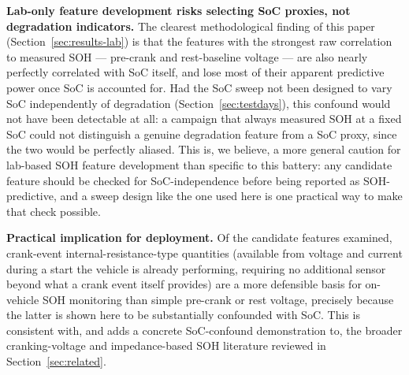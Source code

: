 \documentclass[conference]{IEEEtran}
\begin{document}
\textbf{Lab-only feature development risks selecting SoC proxies, not degradation indicators.} The clearest methodological finding of this paper (Section~\ref{sec:results-lab}) is that the features with the strongest raw correlation to measured SOH --- pre-crank and rest-baseline voltage --- are also nearly perfectly correlated with SoC itself, and lose most of their apparent predictive power once SoC is accounted for. Had the SoC sweep not been designed to vary SoC independently of degradation (Section~\ref{sec:testdays}), this confound would not have been detectable at all: a campaign that always measured SOH at a fixed SoC could not distinguish a genuine degradation feature from a SoC proxy, since the two would be perfectly aliased. This is, we believe, a more general caution for lab-based SOH feature development than specific to this battery: any candidate feature should be checked for SoC-independence before being reported as SOH-predictive, and a sweep design like the one used here is one practical way to make that check possible.

\textbf{Practical implication for deployment.} Of the candidate features examined, crank-event internal-resistance-type quantities (available from voltage and current during a start the vehicle is already performing, requiring no additional sensor beyond what a crank event itself provides) are a more defensible basis for on-vehicle SOH monitoring than simple pre-crank or rest voltage, precisely because the latter is shown here to be substantially confounded with SoC. This is consistent with, and adds a concrete SoC-confound demonstration to, the broader cranking-voltage and impedance-based SOH literature reviewed in Section~\ref{sec:related}.
\end{document}
